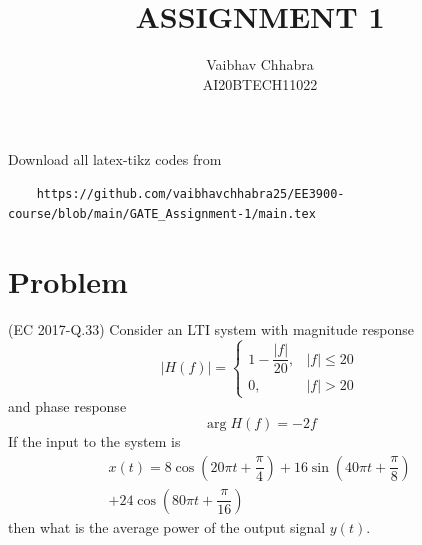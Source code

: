 \documentclass[journal,12pt,twocolumn]{IEEEtran}
\begin{document}
     \def\topbox#1{\raisebox{-\baselineskip}[0in][0in]{#1}}
     \def\midbox#1{\raisebox{-0.5\baselineskip}[0in][0in]{#1}}
\vspace{3cm}
\title{ASSIGNMENT 1}
\author{Vaibhav Chhabra\\ AI20BTECH11022}
\maketitle
\newpage
\bigskip
\renewcommand{\thefigure}{\theenumi}
\renewcommand{\thetable}{\theenumi}
Download all latex-tikz codes from 
%
\begin{lstlisting}
    https://github.com/vaibhavchhabra25/EE3900-course/blob/main/GATE_Assignment-1/main.tex
\end{lstlisting}
%
\section{Problem}
(EC 2017-Q.33) Consider an LTI system with magnitude response
\[
    |H(f)|=
    \begin{cases}
        1-\dfrac{|f|}{20}, & |f|\leq20\\
        0, & |f|>20
    \end{cases}
\]
and phase response
\[
    \arg{H(f)}=-2f
\]
If the input to the system is
\begin{align}
    x(t)=8\cos\left(20\pi t+\dfrac{\pi}{4}\right)+16\sin\left(40\pi t+\dfrac{\pi}{8}\right)\nonumber\\
    +24\cos\left(80\pi t+\dfrac{\pi}{16}\right) \nonumber
\end{align}
then what is the average power of the output signal $y(t)$.
\end{document}
